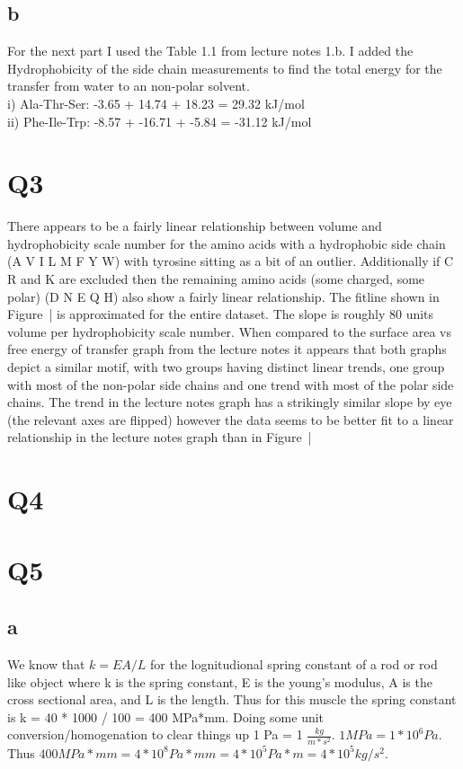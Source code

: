 \documentclass[12pt]{article}
\begin{document}
\subsection{b}
For the next part I used the Table 1.1 from lecture notes 1.b. I added the Hydrophobicity of the side chain measurements to find the total energy for the transfer from water to an non-polar solvent.\\
i) Ala-Thr-Ser: -3.65 + 14.74 + 18.23 = 29.32 kJ/mol\\
ii) Phe-Ile-Trp: -8.57 + -16.71 + -5.84 = -31.12 kJ/mol\\


\section{Q3}
There appears to be a fairly linear relationship between volume and hydrophobicity scale number for the amino acids with a hydrophobic side chain (A V I L M F Y W) with tyrosine sitting as a bit of an outlier. Additionally if C R and K are excluded then the remaining amino acids (some charged, some polar) (D N E Q H) also show a fairly linear relationship. The fitline shown in Figure~| is approximated for the entire dataset. The slope is roughly 80 units volume per hydrophobicity scale number. When compared to the surface area vs free energy of transfer graph from the lecture notes it appears that both graphs depict a similar motif, with two groups having distinct linear trends, one group with most of the non-polar side chains and one trend with most of the polar side chains. The trend in the lecture notes graph has a strikingly similar slope by eye (the relevant axes are flipped) however the data seems to be  better fit to a linear relationship in the lecture notes graph than in Figure~|

\section{Q4}



\section{Q5}
\subsection{a}
We know that $k = {EA}/L$ for the lognitudional spring constant of a rod or rod like object where k is the spring constant, E is the young's modulus, A is the cross sectional area, and L is the length. Thus for this muscle the spring constant is k = 40 * 1000 / 100 = 400 MPa*mm. Doing some unit conversion/homogenation to clear things up 1 Pa = 1 $\frac{kg}{m*s^2}$. $1 MPa = 1*10^6 Pa$. Thus $400 MPa*mm = 4*10^8Pa*mm = 4*10^5 Pa*m = 4*10^5 kg/s^2$.
\end{document}
